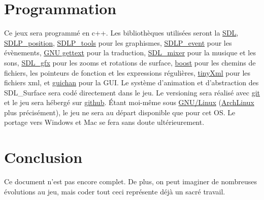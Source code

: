 \documentclass{article}
\begin{document}
\section{Programmation}
Ce jeux sera programmé en c++. Les bibliothèques utilisées seront la \href{http://www.libsdl.org/}{SDL}, \href{https://github.com/lucas8/SDLP\_position}{SDLP\_position}, \href{https://github.com/lucas8/SDLP\_tools}{SDLP\_tools} pour les graphismes, 
\href{https://github.com/lucas8/SDLP\_event}{SDLP\_event} pour les évènements, 
\href{http://www.gnu.org/software/gettext/}{GNU gettext} pour la traduction, 
\href{http://www.libsdl.org/projects/SDL\_mixer/}{SDL\_mixer} pour la musique et les sons, 
\href{http://www.ferzkopp.net/joomla/content/view/19/14/}{SDL\_gfx} pour les zooms et rotations de surface,
\href{http://www.boost.org/}{boost} pour les chemins de fichiers, les pointeurs de fonction et les expressions régulières, 
\href{http://www.grinninglizard.com/tinyxml/index.html}{tinyXml} pour les fichiers xml, 
et \href{http://guichan.sourceforge.net/wiki/index.php/Main\_Page}{guichan} pour la GUI. Le système d'animation et d'abstraction des SDL\_Surface sera codé directement dans le jeu. Le versioning sera réalisé avec \href{http://git-scm.com/}{git} et le jeu sera hébergé sur \href{https://github.com/}{github}. Étant moi-même sous \href{https://fr.wikipedia.org/wiki/Linux}{GNU/Linux} (\href{http://www.archlinux.org/}{ArchLinux} plus précisément), le jeu ne sera au départ disponible que pour cet OS. Le portage vers Windows et Mac se fera sans doute ultérieurement.

\section{Conclusion}
Ce document n'est pas encore complet. De plus, on peut imaginer de nombreuses évolutions au jeu, mais coder tout ceci représente déjà un sacré travail.
\end{document}
